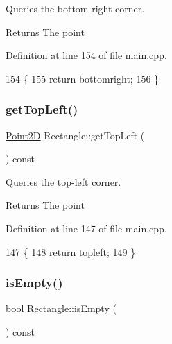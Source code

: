 Queries the bottom-\/right corner. 

\begin{DoxyReturn}{Returns}
The point 
\end{DoxyReturn}


Definition at line 154 of file main.\+cpp.


\begin{DoxyCode}
154                                    \{
155         \textcolor{keywordflow}{return} bottomright;
156     \}
\end{DoxyCode}
\mbox{\label{classRectangle_a812afd6deed0cdec0b4ad7b2bd93871d}} 
\subsubsection{\texorpdfstring{get\+Top\+Left()}{getTopLeft()}}
{\footnotesize\ttfamily \hyperlink{classPoint2D}{Point2D} Rectangle\+::get\+Top\+Left (\begin{DoxyParamCaption}{ }\end{DoxyParamCaption}) const\hspace{0.3cm}{\ttfamily [inline]}}



Queries the top-\/left corner. 

\begin{DoxyReturn}{Returns}
The point 
\end{DoxyReturn}


Definition at line 147 of file main.\+cpp.


\begin{DoxyCode}
147                                \{
148         \textcolor{keywordflow}{return} topleft;
149     \}
\end{DoxyCode}
\mbox{\label{classRectangle_af732bce8c96d2469994825e9a87dbe5f}} 
\subsubsection{\texorpdfstring{is\+Empty()}{isEmpty()}}
{\footnotesize\ttfamily bool Rectangle\+::is\+Empty (\begin{DoxyParamCaption}{ }\end{DoxyParamCaption}) const\hspace{0.3cm}{\ttfamily [inline]}}



